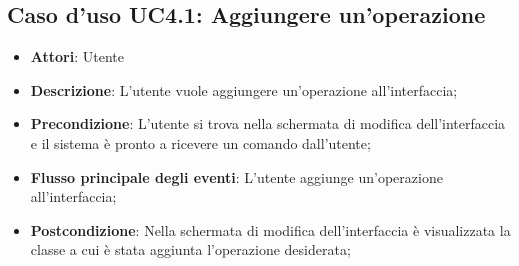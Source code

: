 \documentclass[../AnalisiDeiRequisiti.tex]{subfiles}
\begin{document}
			\subsection{Caso d'uso UC4.1: Aggiungere un'operazione}
			\begin{itemize}
				\item \textbf{Attori}: Utente
				\item \textbf{Descrizione}: L'utente vuole aggiungere un'operazione all'interfaccia;
				\item \textbf{Precondizione}: L'utente si trova nella schermata di modifica dell'interfaccia e il sistema è pronto a ricevere un comando dall'utente;
				\item \textbf{Flusso principale degli eventi}: L'utente aggiunge un'operazione all'interfaccia;
				\item \textbf{Postcondizione}: Nella schermata di modifica dell'interfaccia è visualizzata la classe a cui è stata aggiunta l'operazione desiderata;
			\end{itemize}
\end{document}
